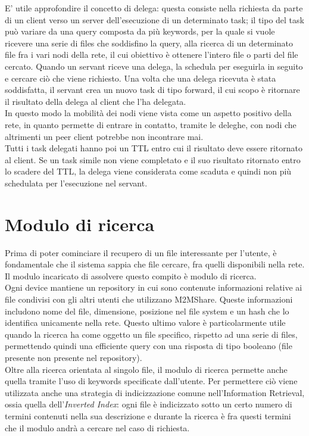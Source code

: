 E' utile approfondire il concetto di delega: questa consiste nella richiesta da parte di un client verso un server dell'esecuzione di un determinato task; il tipo del task pu\`{o} variare da una query composta da pi\`{u} keywords, per la quale si vuole ricevere una serie di files che soddisfino la query, alla ricerca di un determinato file fra i vari nodi della rete, il cui obiettivo \`{e} ottenere l'intero file o parti del file cercato. Quando un servant riceve una delega, la schedula per eseguirla in seguito e cercare ci\`{o} che viene richiesto. Una volta che una delega ricevuta \`{e} stata soddisfatta, il servant crea un nuovo task di tipo forward, il cui scopo \`{e} ritornare il risultato della delega al client che l'ha delegata. 
\\
In questo modo la mobilità dei nodi viene vista come un aspetto positivo della rete, in quanto permette di entrare in contatto, tramite le deleghe, con nodi che altrimenti un peer client potrebbe non incontrare mai.
\\
Tutti i task delegati hanno poi un TTL entro cui il risultato deve essere ritornato al client. Se un task simile non viene completato e il suo risultato ritornato entro lo scadere del TTL, la delega viene considerata come scaduta e quindi non più schedulata per l'esecuzione nel servant.


\section{Modulo di ricerca}
Prima di poter cominciare il recupero di un file interessante per l'utente, \`{e} fondamentale che il sistema sappia che file cercare, fra quelli disponibili nella rete. Il modulo incaricato di assolvere questo compito \`{e} modulo di ricerca.
\\

Ogni device mantiene un repository in cui sono contenute informazioni relative ai file condivisi con gli altri utenti che utilizzano M2MShare. Queste informazioni includono nome del file, dimensione, posizione nel file system e un hash che lo identifica unicamente nella rete. Questo ultimo valore \`{e} particolarmente utile quando la ricerca ha come oggetto un file specifico, rispetto ad una serie di files, permettendo quindi una efficiente query con una risposta di tipo booleano (file presente \/ non presente nel repository).
\\
Oltre alla ricerca orientata al singolo file, il modulo di ricerca permette anche quella tramite l'uso di keywords specificate dall'utente. Per permettere ci\`{o} viene utilizzata anche una strategia di indicizzazione comune nell'Information Retrieval, ossia quella dell'\textit{Inverted Index}: ogni file \`{e} indicizzato sotto un certo numero di termini contenuti nella sua descrizione e durante la ricerca \`{e} fra questi termini che il modulo andrà a cercare nel caso di richiesta. 


